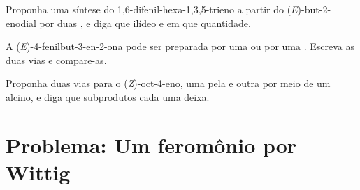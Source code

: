 \begin{exercise}[$\star\star\star$]\label{exo:b2:wittig:10}
Proponha uma síntese do 1,6-difenil-hexa-1,3,5-trieno a partir do (\textit{E})-but-2-enodial
 por duas , e diga que ilídeo e em que quantidade.
\end{exercise}

\begin{exercise}[$\star\star\star$]\label{exo:b2:wittig:11}
A (\textit{E})-4-fenilbut-3-en-2-ona pode ser preparada por uma  ou por uma . Escreva as duas vias e compare-as.
\end{exercise}

\begin{exercise}[$\star\star\star$]\label{exo:b2:wittig:12}
Proponha duas vias para o (\textit{Z})-oct-4-eno, uma pela  e outra por meio de um
alcino, e diga que subprodutos cada uma deixa.
\end{exercise}

\section{Problema: Um feromônio por Wittig}

